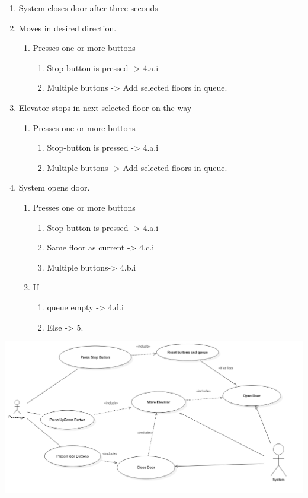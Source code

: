 \documentclass[a4paper, norsk]{article}
\begin{document}
\begin{enumerate}
\begin{enumerate}
\begin{enumerate}
									\end{enumerate}
				\end{enumerate}
	\item  System closes door after three seconds
	\item  Moves in desired direction.
	\begin{enumerate}
	\item  Presses one or more buttons
		\begin{enumerate}
	\item Stop-button is pressed -> 4.a.i
	\item  Multiple buttons ->  Add selected floors in queue.
			\end{enumerate}
			\end{enumerate}
	\item Elevator stops in next selected floor on the way
	\begin{enumerate}
	\item  Presses one or more buttons
		\begin{enumerate}
	\item  Stop-button is pressed -> 4.a.i
	\item  Multiple buttons ->  Add selected floors in queue.
		\end{enumerate}
	\end{enumerate}
	\item  System opens door.
	\begin{enumerate}
	\item  Presses one or more buttons
		\begin{enumerate}
	\item  Stop-button is pressed -> 4.a.i
	\item  Same floor as current ->  4.c.i
	\item  Multiple buttons-> 4.b.i
			\end{enumerate}
	\item   If
		\begin{enumerate}
	\item  queue empty ->  4.d.i
	\item  Else -> 5.
		\end{enumerate}
		\end{enumerate}
\end{enumerate}
\includegraphics[width=\textwidth]{./Model1__UseCase_1.png}
\end{document}
